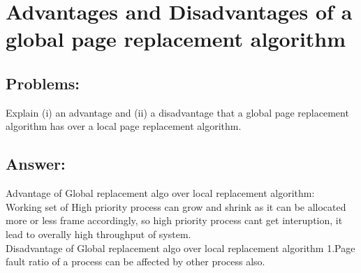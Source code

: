 \newpage
\section{Advantages and Disadvantages of  a global page replacement algorithm}
\subsection{Problems:}
Explain (i) an advantage and (ii) a disadvantage that a global page replacement algorithm has
over a local page replacement algorithm.

\subsection{Answer:}
Advantage of Global replacement algo over local replacement algorithm:\\

Working set of High priority process can grow and shrink as it can be allocated more or less frame accordingly, so high priority process cant get interuption, it lead to overally high throughput of system. \\

Disadvantage of Global replacement algo over local replacement algorithm
1.Page fault ratio of a process can be affected by other process also.
